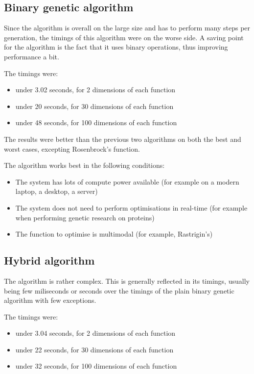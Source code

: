 \documentclass[conference]{IEEEtran}
\begin{document}
\subsection{Binary genetic algorithm}
Since the algorithm is overall on the large size and has to perform many steps per generation, the timings of this algorithm
were on the worse side. A saving point for the algorithm is the fact that it uses binary operations, thus improving performance
a bit.

The timings were:
\begin{itemize}
    \item under 3.02 seconds, for 2 dimensions of each function
    \item under 20 seconds, for 30 dimensions of each function
    \item under 48 seconds, for 100 dimensions of each function
\end{itemize}

The results were better than the previous two algorithms on both the best and worst cases, excepting Rosenbrock's function.

The algorithm works best in the following conditions:
\begin{itemize}
    \item The system has lots of compute power available (for example on a modern laptop, a desktop, a server)
    \item The system does not need to perform optimisations in real-time (for example when performing genetic research on proteins)
    \item The function to optimise is multimodal (for example, Rastrigin's)
\end{itemize}

\subsection{Hybrid algorithm}
The algorithm is rather complex. This is generally reflected in its timings, usually being few miliseconds or seconds over
the timings of the plain binary genetic algorithm with few exceptions.

The timings were:
\begin{itemize}
    \item under 3.04 seconds, for 2 dimensions of each function
    \item under 22 seconds, for 30 dimensions of each function
    \item under 32 seconds, for 100 dimensions of each function
\end{itemize}
\end{document}
